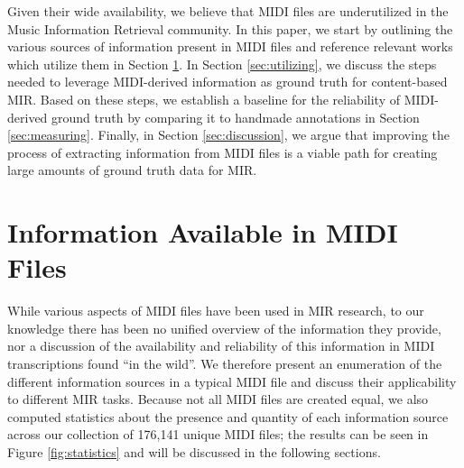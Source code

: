 \documentclass{article}
\begin{document}
Given their wide availability, we believe that MIDI files are underutilized in the Music Information Retrieval community.
In this paper, we start by outlining the various sources of information present in MIDI files and reference relevant works which utilize them in Section \ref{sec:information}.
In Section \ref{sec:utilizing}, we discuss the steps needed to leverage MIDI-derived information as ground truth for content-based MIR.
Based on these steps, we establish a baseline for the reliability of MIDI-derived ground truth by comparing it to handmade annotations in Section \ref{sec:measuring}.
Finally, in Section \ref{sec:discussion}, we argue that improving the process of extracting information from MIDI files is a viable path for creating large amounts of ground truth data for MIR.

\section{Information Available in MIDI Files}
\label{sec:information}

While various aspects of MIDI files have been used in MIR research, to our knowledge there has been no unified overview of the information they provide, nor a discussion of the availability and reliability of this information in MIDI transcriptions found ``in the wild''.
We therefore present an enumeration of the different information sources in a typical MIDI file and discuss their applicability to different MIR tasks.
Because not all MIDI files are created equal, we also computed statistics about the presence and quantity of each information source across our collection of 176,141 unique MIDI files; the results can be seen in Figure \ref{fig:statistics} and will be discussed in the following sections.
\end{document}
